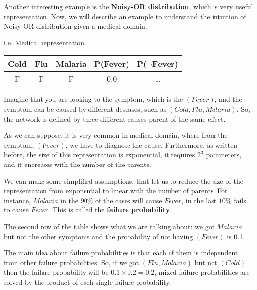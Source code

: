 Another interesting example is the \textbf{Noisy-OR distribution}, which is very useful representation. Now, we will describe an example to understand the intuition
of Noisy-OR distribution given a medical domain.
\begin{example}
    i.e. Medical representation. \vspace{7pt}

    \begin{center}
        \begin{tabular}{|c|c|c|c|c|}
            \hline
            \bf Cold & \bf Flu & \bf Malaria & \bf P(Fever) & \bf P($\mathbf{\neg Fever}$) \\
            \hline
            F & F & F & 0.0 & \dots \\
            \hline
        \end{tabular}
    \end{center} \vspace{7pt}

    Imagine that you are looking to the symptom, which is the $(Fever)$, and the symptom can be caused by different deseases, such as $(Cold, Flu, Malaria)$.
    So, the network is defined by three different causes parent of the same effect. \vspace{3.5pt}
    
    As we can suppose, it is very common in medical domain, where from the 
    symptom, $(Fever)$, we have to diagnose the cause. Furthermore, as written before, the size of this representation is exponential, it requires $2^3$ parameters,
    and it encreases with the number of the parents. \vspace{3.5pt}

    We can make some simplified assumptions, that let us to reduce the size of the representation from exponential to linear with the number of parents. For instance,
    $Malaria$ in the $90\%$ of the cases will cause $Fever$, in the last $10\%$ fails to cause $Fever$. This is called the \textbf{failure probability}. \vspace{3.5pt}

    The second row of the table shows what we are talking about: we got $Malaria$ but not the other symptoms and the probability of not having $(Fever)$ is 0.1. \vspace{3.5pt}

    The main idea about failure probabilities is that each of them is independent from other failure probabilities. So, if we got $(Flu, Malaria)$ but not $(Cold)$ then the 
    failure probability will be $0.1 \times 0.2=0.2$, mixed failure probabilities are solved by the product of each single failure probability.
\end{example}
